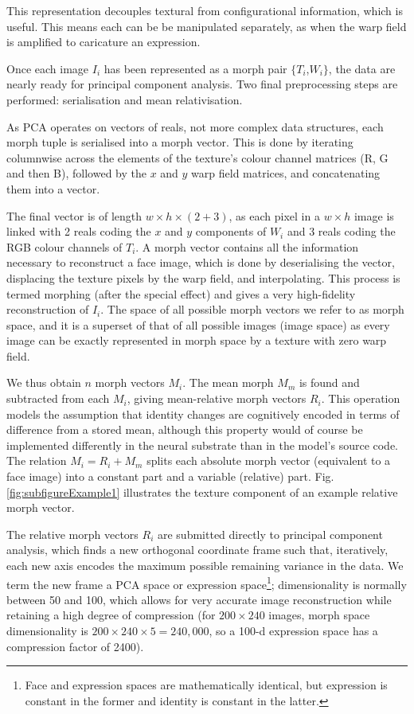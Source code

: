 \documentclass[runningheads]{llncs}
\begin{document}
This representation decouples textural from configurational information, which is  useful. This means each can be be manipulated separately, as when the warp field is amplified to caricature an expression\cite{brennan1985caricature}.

Once each image $I_i$ has been represented as a morph pair  $\{T_i$,$W_i\}$, the data are nearly ready for principal component analysis. Two final preprocessing steps are performed: serialisation and mean relativisation.

As PCA operates on vectors of reals,  not more complex data structures, each morph tuple is serialised into a morph vector. This is done by iterating columnwise across the elements of the texture's colour channel matrices (R, G and then B), followed by the $x$ and $y$ warp field matrices, and  concatenating them into a vector.

The final vector is of length $w \times h \times (2 + 3)$, as each pixel in a $w \times h$ image is linked with 2 reals coding the $x$ and $y$ components of $W_i$ and 3 reals coding the RGB colour channels of $T_i$. A morph vector contains all the information necessary to reconstruct a face image, which is done by deserialising the vector, displacing the texture pixels by the warp field, and interpolating. This process is termed morphing (after the special effect\cite{rotshtein2004morphing}) and gives a very high-fidelity reconstruction of $I_i$.  The space of all possible morph vectors we refer to  as morph space, and it is a superset of that of all possible images (image space) as every image can be exactly represented in morph space by a texture with zero warp field.

We thus obtain $n$ morph vectors $M_i$. The mean morph $M_m$ is found and subtracted from each $M_i$, giving mean-relative morph vectors $R_i$. This operation models the assumption that identity changes are cognitively encoded in terms of difference from a stored mean, although this property would of course be implemented differently in the neural substrate than in the model's source code.
The relation $M_i = R_i + M_m$ splits each absolute morph vector (equivalent to a face image) into a constant part and a variable (relative) part. Fig. \ref{fig:subfigureExample1} illustrates the texture component of an example relative morph vector.

The relative morph vectors $R_i$ are submitted directly to principal component analysis, which finds a new orthogonal coordinate frame such that, iteratively, each new axis encodes the maximum possible remaining variance in the data. We term the new frame a PCA space or expression space\footnote{Face and expression spaces are mathematically identical, but expression is constant in the former and identity is constant in the latter.}; dimensionality is normally between 50 and 100, which allows for very accurate image reconstruction while retaining a high degree of compression (for $200 \times 240$ images, morph space dimensionality is $200 \times 240 \times 5 = 240,000$, so a 100-d expression space has a compression factor of 2400).
\end{document}
